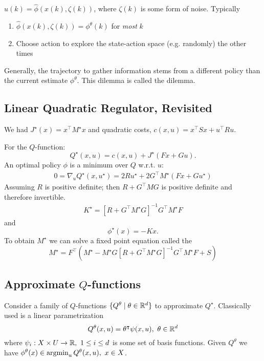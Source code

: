 \(u(k)=\hat{\phi}(x(k),\zeta(k))\), where \(\zeta(k)\) is some form of noise.
Typically 
\begin{enumerate}
    \item \(\hat{\phi}(x(k),\zeta(k))=\phi^\theta(k)\) for \textit{most} \(k\)
    \item Choose action to explore the state-action space (e.g. randomly) the other times
\end{enumerate}

Generally, the trajectory to gather information 
stems from a different policy than the current estimate \(\phi^\theta\). 
This dilemma is called the  dilemma.

\subsection{Linear Quadratic Regulator, Revisited} 

We had \(J^\star(x)=x^\intercal M^\star x\) and quadratic costs,
\(c(x,u)=x^\intercal S x+ u^\intercal R u\).

For the \(Q\)-function: 
\[Q^\star(x,u)=c(x,u)+J^\star(Fx+Gu).\]
An optimal policy \(\phi\) is a minimum over \(Q\) w.r.t. \(u\):
\begin{align*}
    0=\nabla_u Q^\star(x,u^\star)=2Ru^\star+2G^\intercal M^\star(Fx + Gu^\star)
\end{align*}
Assuming \(R\) is positive definite; then \(R+G^\intercal M G\) is positive definite
and therefore invertible.
\begin{align*}
    K^\star=\left[R+G^\intercal M^\star G\right]^{-1}G^\intercal M^\star F
\end{align*}
and 
\[\phi^\star(x)=-Kx.\]
To obtain \(M^\star\) we can solve
a fixed point equation called the 
\begin{equation}\label{eq:algebraic_riccati}
    M^\star=F^\intercal\left(M^\star-M^\star G\left[R+G^\intercal M^\star G\right]^{-1}G^\intercal M^\star F+S\right)
\end{equation} 
\subsection{Approximate \(Q\)-functions}
Consider a family of \(Q\)-functions \(\{Q^\theta\mid \theta\in \mathbb{R}^d\}\)
to approximate \(Q^\star\). Classically used is a linear 
parametrization 
\[Q^\theta(x,u)=\theta^\intercal \psi(x,u),\  \theta\in\mathbb{R}^d\]  
where \(\psi_i:X\times U\to\mathbb{R},\ 1\leq i\leq d\) is some set of 
basis functions. 
Given \(Q^\theta\) we have \(\phi^\theta(x)\in\operatorname*{\text{argmin}}_{u}Q^\theta(x,u),\ x\in X\).


